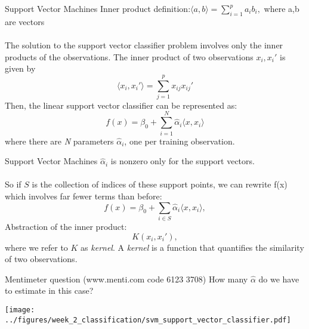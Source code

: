 \documentclass[notes]{beamer}          %
\begin{document}
\begin{frame}{Support Vector Machines}
Inner product definition:$\langle {a,b} \rangle = \sum_{i=1}^{p} a_{i}b_{i},$ where a,b are vectors\\~\\
The solution to the support vector classifier problem involves only the inner products of the observations. The inner product of two observations $x_i, x_i'$ is given by
\begin{equation*}
\langle {x_i,x_i'} \rangle = \sum_{j=1}^{p} x_{ij} x_{ij}' 
\end{equation*}
Then, the linear support vector classifier can be represented as:
\begin{equation*}
f(x) = \beta_0 + \sum_{i=1}^{N} \hat \alpha_i \langle {x,x_i} \rangle
\end{equation*}
where there are \textit{N} parameters $\hat \alpha_i$, one per training observation.
\end{frame}

%


\begin{frame}{Support Vector Machines}
$\hat{\alpha}_i$ is nonzero only for the support vectors. \\~\\
So if $\mathit{S}$ is the collection of indices of these support points, we can rewrite f(x) which involves far fewer terms than before:
\begin{equation*}
f(x) = \beta_0 + \sum_{i\in\mathit{S}} \hat{\alpha}_i \langle {x,x_i} \rangle,
\end{equation*}
Abstraction of the inner product:
\begin{equation*}
\mathit{K}(x_i,x_i'),
\end{equation*}
where we refer to $\mathit{K}$ as \textit{kernel}. 
A \textit{kernel} is a function that quantifies the similarity of two observations.
\end{frame}

\begin{frame}{Mentimeter question (www.menti.com code 6123 3708)}
How many $\hat \alpha$ do we have to estimate in this case?
\begin{center}
\texttt{[image: ../figures/week\_2\_classification/svm\_support\_vector\_classifier.pdf]}  
\end{center}
\end{frame}
\end{document}
